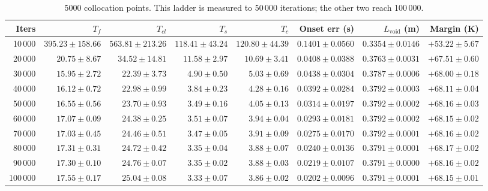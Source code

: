 \documentclass[11pt,a4paper]{article}
\begin{document}
\begin{table}[!ht]
\caption{5000 collocation points. This ladder is measured to 50\,000 iterations; the other
two reach 100\,000.}
\label{tab:lad5000}
\centering\footnotesize\setlength{\tabcolsep}{4pt}
\begin{tabular}{@{}rrrrrrrr@{}}
\toprule
Iters & $T_f$ & $T_{cl}$ & $T_s$ & $T_c$ & Onset err (s) & $L_{\mathrm{void}}$ (m) & Margin (K) \\
\midrule
10\,000 & $395.23 \pm 158.66$ & $563.81 \pm 213.26$ & $118.41 \pm 43.24$ & $120.80 \pm 44.39$ & $0.1401 \pm 0.0560$ & $0.3354 \pm 0.0146$ & $+53.22 \pm 5.67$ \\
20\,000 & $20.75 \pm 8.67$ & $34.52 \pm 14.81$ & $11.58 \pm 2.97$ & $10.69 \pm 3.41$ & $0.0408 \pm 0.0388$ & $0.3763 \pm 0.0031$ & $+67.51 \pm 0.60$ \\
30\,000 & $15.95 \pm 2.72$ & $22.39 \pm 3.73$ & $4.90 \pm 0.50$ & $5.03 \pm 0.69$ & $0.0438 \pm 0.0304$ & $0.3787 \pm 0.0006$ & $+68.00 \pm 0.18$ \\
40\,000 & $16.12 \pm 0.72$ & $22.98 \pm 0.99$ & $3.84 \pm 0.23$ & $4.28 \pm 0.16$ & $0.0392 \pm 0.0284$ & $0.3792 \pm 0.0003$ & $+68.11 \pm 0.04$ \\
50\,000 & $16.55 \pm 0.56$ & $23.70 \pm 0.93$ & $3.49 \pm 0.16$ & $4.05 \pm 0.13$ & $0.0314 \pm 0.0197$ & $0.3792 \pm 0.0002$ & $+68.16 \pm 0.03$ \\
60\,000 & $17.07 \pm 0.09$ & $24.38 \pm 0.25$ & $3.51 \pm 0.07$ & $3.94 \pm 0.04$ & $0.0293 \pm 0.0181$ & $0.3792 \pm 0.0002$ & $+68.15 \pm 0.02$ \\
70\,000 & $17.03 \pm 0.45$ & $24.46 \pm 0.51$ & $3.47 \pm 0.05$ & $3.91 \pm 0.09$ & $0.0275 \pm 0.0170$ & $0.3792 \pm 0.0001$ & $+68.16 \pm 0.02$ \\
80\,000 & $17.31 \pm 0.31$ & $24.72 \pm 0.42$ & $3.35 \pm 0.04$ & $3.88 \pm 0.07$ & $0.0240 \pm 0.0136$ & $0.3791 \pm 0.0001$ & $+68.17 \pm 0.02$ \\
90\,000 & $17.30 \pm 0.10$ & $24.76 \pm 0.07$ & $3.35 \pm 0.02$ & $3.88 \pm 0.03$ & $0.0219 \pm 0.0107$ & $0.3791 \pm 0.0000$ & $+68.16 \pm 0.02$ \\
100\,000 & $17.55 \pm 0.17$ & $25.04 \pm 0.08$ & $3.33 \pm 0.07$ & $3.86 \pm 0.02$ & $0.0202 \pm 0.0096$ & $0.3791 \pm 0.0001$ & $+68.15 \pm 0.01$ \\
\bottomrule
\end{tabular}
\end{table}
\end{document}
